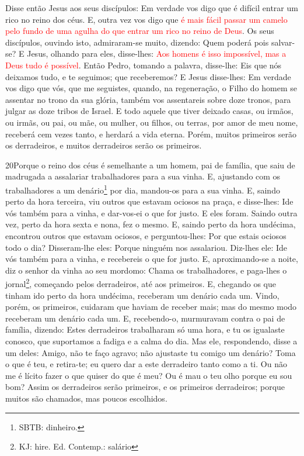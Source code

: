 Disse então Jesus aos seus discípulos: Em verdade vos digo que é
difícil entrar um rico no reino dos céus. E, outra vez vos
digo que \textcolor{red}{é mais fácil passar um camelo pelo fundo de uma
agulha do que entrar um rico no reino de Deus}. Os seus
discípulos, ouvindo isto, admiraram-se muito, dizendo: Quem poderá
pois salvar-se? E Jesus, olhando para eles, disse-lhes:
\textcolor{red}{Aos homens é isso impossível, mas a Deus tudo é possível}.
Então Pedro, tomando a palavra, disse-lhe: Eis que nós
deixamos tudo, e te seguimos; que receberemos? E Jesus
disse-lhes: Em verdade vos digo que vós, que me seguistes, quando,
na regeneração, o Filho do homem se assentar no trono da sua glória,
também vos assentareis sobre doze tronos, para julgar as doze tribos
de Israel. E todo aquele que tiver deixado casas, ou irmãos,
ou irmãs, ou pai, ou mãe, ou mulher, ou filhos, ou terras, por amor
de meu nome, receberá cem vezes tanto, e herdará a vida eterna.
Porém, muitos primeiros serão os derradeiros, e muitos
derradeiros serão os primeiros.

\medskip

\lettrine{20} Porque o reino dos céus é semelhante a um homem,
pai de família, que saiu de madrugada a assalariar trabalhadores
para a sua vinha. E, ajustando com os trabalhadores a um
denário\footnote{SBTB: dinheiro.} por dia, mandou-os para a sua
vinha. E, saindo perto da hora terceira, viu outros que estavam
ociosos na praça, e disse-lhes: Ide vós também para a vinha, e
dar-vos-ei o que for justo. E eles foram. Saindo outra vez,
perto da hora sexta e nona, fez o mesmo. E, saindo perto da hora
undécima, encontrou outros que estavam ociosos, e perguntou-lhes:
Por que estais ociosos todo o dia? Disseram-lhe eles: Porque
ninguém nos assalariou. Diz-lhes ele: Ide vós também para a vinha, e
recebereis o que for justo. E, aproximando-se a noite, diz o
senhor da vinha ao seu mordomo: Chama os trabalhadores, e paga-lhes
o jornal\footnote{KJ: hire. Ed. Contemp.: salário}, começando pelos
derradeiros, até aos primeiros. E, chegando os que tinham ido
perto da hora undécima, receberam um denário cada um. Vindo,
porém, os primeiros, cuidaram que haviam de receber mais; mas do
mesmo modo receberam um denário cada um. E, recebendo-o,
murmuravam contra o pai de família, dizendo: Estes
derradeiros trabalharam só uma hora, e tu os igualaste conosco, que
suportamos a fadiga e a calma do dia. Mas ele, respondendo,
disse a um deles: Amigo, não te faço agravo; não ajustaste tu comigo
um denário? Toma o que é teu, e retira-te; eu quero dar a
este derradeiro tanto como a ti. Ou não me é lícito fazer o
que quiser do que é meu? Ou é mau o teu olho porque eu sou bom?
Assim os derradeiros serão primeiros, e os primeiros
derradeiros; porque muitos são chamados, mas poucos escolhidos.

